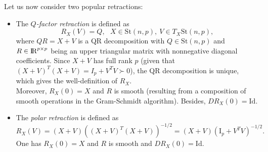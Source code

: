 \documentclass[10pt,a4paper]{book}
\theoremstyle{definition}
\theoremstyle{plain}
\theoremstyle{remark}
\newcommand \Stif {\textrm{St}}
\def\R{{\rm I\kern-0.16em R}}
\begin{document}
Let us now consider two popular retractions:
\begin{itemize}
\item The \emph{$Q$-factor retraction} is defined as
$$R_X(V)=Q,~~~X \in \Stif(n,p),~V \in T_X \Stif(n,p),$$
where $QR=X+V$ is a QR decomposition with $Q\in \Stif(n,p)$ and $R\in \R^{p\times p}$ being an upper triangular matrix with nonnegative diagonal coefficients. Since $X+V$ has full rank $p$ (given that $(X+V)^{T}(X+V)=I_p+V^TV \succ 0$), the QR decomposition is unique, which gives the well-definition of $R_X$. \\ Moreover, $R_X(0)=X$ and $R$ is smooth (resulting from a composition of smooth operations in the Gram-Schmidt algorithm). Besides, $DR_X(0)=\text{Id}$.
\item The \emph{polar retraction} is defined as
$$R_X(V)=(X+V)\left((X+V)^{T}(X+V)\right)^{-1/2}=(X+V)(\text{I}_p+V^{T}V)^{-1/2}.$$
One has $R_X(0)=X$ and $R$ is smooth and $DR_X(0)=\text{Id}$. 
\end{itemize}
\end{document}
